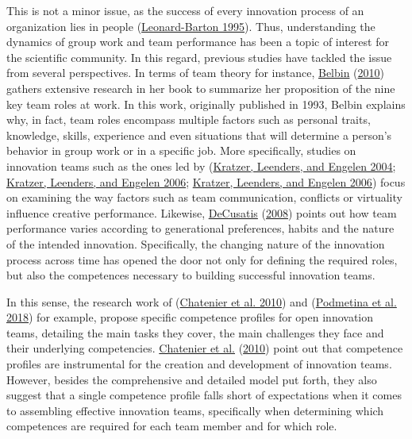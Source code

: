 \documentclass[AMA,STIX1COL,APA,STIX2COL]{WileyNJD-v2}
\begin{document}
This is not a minor issue, as the success of every innovation process of
an organization lies in people
(\protect\hyperlink{ref-Leonard1995}{Leonard-Barton 1995}). Thus,
understanding the dynamics of group work and team performance has been a
topic of interest for the scientific community. In this regard, previous
studies have tackled the issue from several perspectives. In terms of
team theory for instance, \protect\hyperlink{ref-Belbin2010}{Belbin}
(\protect\hyperlink{ref-Belbin2010}{2010}) gathers extensive research in
her book to summarize her proposition of the nine key team roles at
work. In this work, originally published in 1993, Belbin explains why,
in fact, team roles encompass multiple factors such as personal traits,
knowledge, skills, experience and even situations that will determine a
person's behavior in group work or in a specific job. More specifically,
studies on innovation teams such as the ones led by
(\protect\hyperlink{ref-Kratzer2004}{Kratzer, Leenders, and Engelen
2004}; \protect\hyperlink{ref-Kratzer2006-A}{Kratzer, Leenders, and
Engelen 2006}; \protect\hyperlink{ref-Kratzer2006-B}{Kratzer, Leenders,
and Engelen 2006}) focus on examining the way factors such as team
communication, conflicts or virtuality influence creative performance.
Likewise, \protect\hyperlink{ref-DeCusatis2008}{DeCusatis}
(\protect\hyperlink{ref-DeCusatis2008}{2008}) points out how team
performance varies according to generational preferences, habits and the
nature of the intended innovation. Specifically, the changing nature of
the innovation process across time has opened the door not only for
defining the required roles, but also the competences necessary to
building successful innovation teams.

In this sense, the research work of
(\protect\hyperlink{ref-Chatenier2010}{Chatenier et al. 2010}) and
(\protect\hyperlink{ref-Podmetina2018}{Podmetina et al. 2018}) for
example, propose specific competence profiles for open innovation teams,
detailing the main tasks they cover, the main challenges they face and
their underlying competencies.
\protect\hyperlink{ref-Chatenier2010}{Chatenier et al.}
(\protect\hyperlink{ref-Chatenier2010}{2010}) point out that competence
profiles are instrumental for the creation and development of innovation
teams. However, besides the comprehensive and detailed model put forth,
they also suggest that a single competence profile falls short of
expectations when it comes to assembling effective innovation teams,
specifically when determining which competences are required for each
team member and for which role.
\end{document}
